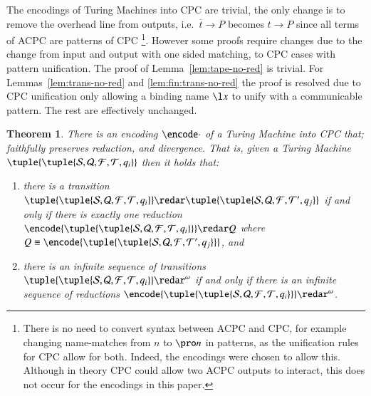 \documentclass[submission,copyright,creativecommons]{eptcs}
\newtheorem{theorem}{Theorem}[section]
\renewcommand{\iap}[1]{#1\to}
\renewcommand{\oap}[1]{\overline{#1}\to}
\newcommand{\tmach}[1]{\tuple{\tuple{#1}}}
\begin{document}
The encodings of Turing Machines into CPC are trivial, the only change is to remove
the overhead line from outputs, i.e.~$\oap t P$ becomes $\iap t P$ since all terms of
ACPC are patterns of CPC
\footnote{There is no need to convert syntax between ACPC and CPC, for example changing
name-matches from $n$ to $\pro n$ in patterns, as the unification rules for CPC allow for both.
Indeed, the encodings were chosen to allow this.
Although in theory
CPC could allow two ACPC outputs to interact, this does not occur for the encodings in this paper.}.
However some proofs require changes due to the change from input and
output with one sided matching, to CPC cases with pattern unification.
The proof of Lemma~\ref{lem:tape-no-red} is trivial. For Lemmas~\ref{lem:trans-no-red}
and \ref{lem:fin:trans-no-red}
the proof is resolved due to CPC unification only allowing a binding name $\l x$ to
unify with a communicable pattern.
The rest are effectively unchanged.

\begin{theorem}
\label{thm:cpc:done}
There is an encoding $\encode\cdot$ of a Turing Machine into CPC that;
faithfully preserves reduction, and
divergence.
That is, given a Turing Machine $\tmach{{\mathcal S}, {\mathcal Q}, {\mathcal F}, {\mathcal T}, q_i}$
then it holds that:
\begin{enumerate}
\item there is a transition
$\tmach{{\mathcal S}, {\mathcal Q}, {\mathcal F}, {\mathcal T}, q_i}\redar
\tmach{{\mathcal S}, {\mathcal Q}, {\mathcal F}, {\mathcal T}', q_j}$
if and only if there is exactly one reduction
$\encode{\tmach{{\mathcal S}, {\mathcal Q}, {\mathcal F}, {\mathcal T}, q_i}}\redar Q$
where $Q\equiv\encode{\tmach{{\mathcal S}, {\mathcal Q}, {\mathcal F}, {\mathcal T}', q_j}}$, and
\item there is an infinite sequence of transitions
$\tmach{{\mathcal S}, {\mathcal Q}, {\mathcal F}, {\mathcal T}, q_i}\redar^\omega$
if and only if there is an infinite sequence of reductions
$\encode{\tmach{{\mathcal S}, {\mathcal Q}, {\mathcal F}, {\mathcal T}, q_i}}\redar^\omega$.
\end{enumerate}
\end{theorem}

\medskip


\newcommand{\cheq}{\stackrel\cdot\leftrightarrow}
\newcommand{\terms}{{\bf T}}
\newcommand{\assertion}{{\bf A}}
\newcommand{\one}{{\bf 1}}
\newcommand{\compose}{\otimes}
\newcommand{\assert}[1]{\llparenthesis \, #1 \, \rrparenthesis}
\newcommand{\fram}[1]{{\cal F}(#1)}
\end{document}
